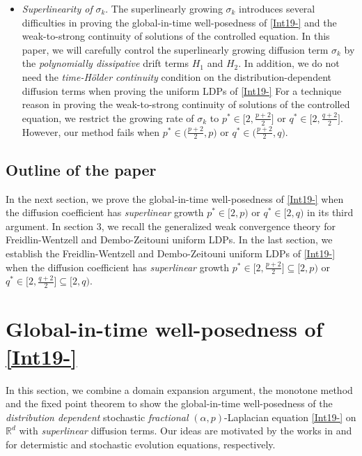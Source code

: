 \documentclass[11pt]{article}
\numberwithin{equation}{section}
\begin{document}
\begin{itemize}
\item \emph{Superlinearity of} $\sigma_k$.
The superlinearly growing $\sigma_k$ introduces several difficulties in proving the global-in-time well-posedness of \eqref{Int19-} and the weak-to-strong
continuity of solutions of the controlled equation.
In this paper, we will
carefully control the
superlinearly growing diffusion term $\sigma_k$ by the \emph{polynomially dissipative} drift terms $H_1$ and $H_2$. In addition, we do not need the \emph{time-H\"{o}lder continuity} condition on the distribution-dependent diffusion terms when proving the uniform LDPs of \eqref{Int19-}
For a technique reason in proving the weak-to-strong
continuity of solutions of the controlled equation, we restrict the growing rate
 of $\sigma_k$ to
 $p^*\in\big[2,\frac{p+2}{2}\big]$
 or  $q^*\in\big[2,\frac{q+2}{2}\big]$.
However, our method fails when  $p^*\in\big(\frac{p+2}{2},p)$ or  $q^*\in\big(\frac{p+2}{2},q)$.
\end{itemize}








\subsection{Outline of the paper}
In the next section, we prove the global-in-time well-posedness of \eqref{Int19-} when the diffusion coefficient has \emph{superlinear} growth   $p^*\in[2,p)$
or  $q^*\in[2,q)$ in its third argument. In section 3, we recall the generalized weak convergence theory
for Freidlin-Wentzell and Dembo-Zeitouni uniform LDPs. In the last section, we establish the Freidlin-Wentzell and Dembo-Zeitouni uniform LDPs of \eqref{Int19-} when the diffusion coefficient has \emph{superlinear} growth   $p^*\in\big[2,\frac{p+2}{2}\big]\subseteq[2,p)$
or  $q^*\in\big[2,\frac{q+2}{2}\big]\subseteq[2,q)$.



\section{Global-in-time well-posedness
of \eqref{Int19-}}
In this section, we combine a
domain expansion argument,  the
monotone method  and the fixed point theorem
to show  the  global-in-time well-posedness of the \emph{distribution dependent}
stochastic \emph{fractional} $(\alpha,p)$-Laplacian equation
\eqref{Int19-} on $\mathbb{R}^d$ with
\emph{superlinear} diffusion terms. Our ideas are motivated by the works in \cite{Browder,Krylov,Minty,Pardoux,
Zeidler} and \cite{Caraballo4,
Krylov,LR1,Wangjde,Wang-wangb,
Wang-wangb2,RWangsubmitted} for determistic and stochastic evolution equations, respectively.
\end{document}
